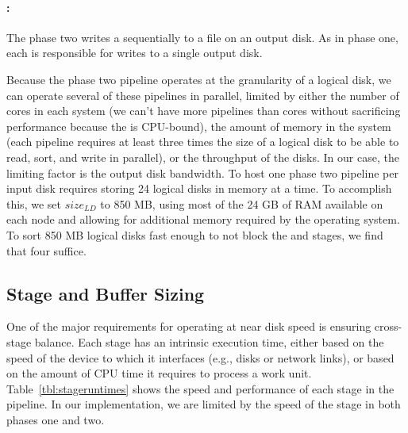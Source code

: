\paragraph{\writer:}  The phase two \writer writes a \phasetwobuffer
sequentially to a file on an output disk. As in phase one, each \writer is
responsible for writes to a single output disk.

Because the phase two pipeline operates at the granularity of a logical disk,
we can operate several of these pipelines in parallel, limited by either the
number of cores in each system (we can't have more pipelines than cores without
sacrificing performance because the \sorter is CPU-bound), the amount of
memory in the system (each pipeline requires at least three times the size of a
logical disk to be able to read, sort, and write in parallel), or the
throughput of the disks.  In our case, the limiting factor is the
output disk bandwidth.  To host one phase two pipeline per input
disk requires storing 24 logical disks in memory at a time.  To
accomplish this, we set $size_{LD}$ to 850 MB, using most of the 24 GB of RAM
available on each node and allowing for additional memory required by the
operating system.  To sort 850 MB logical disks fast enough to not block the
\reader and \writer stages, we find that four \sorters suffice.

\subsection{Stage and Buffer Sizing}

One of the major requirements for operating \tritonsort at near disk speed is
ensuring cross-stage balance.  Each stage has an intrinsic execution time,
either based on the speed of the device to which it interfaces (e.g., disks or
network links), or based on the amount of CPU time it requires to process a
work unit.  Table~\ref{tbl:stageruntimes} shows the speed and performance of
each stage in the pipeline.  In our implementation, we are limited by the speed
of the \writer stage in both phases one and two.

